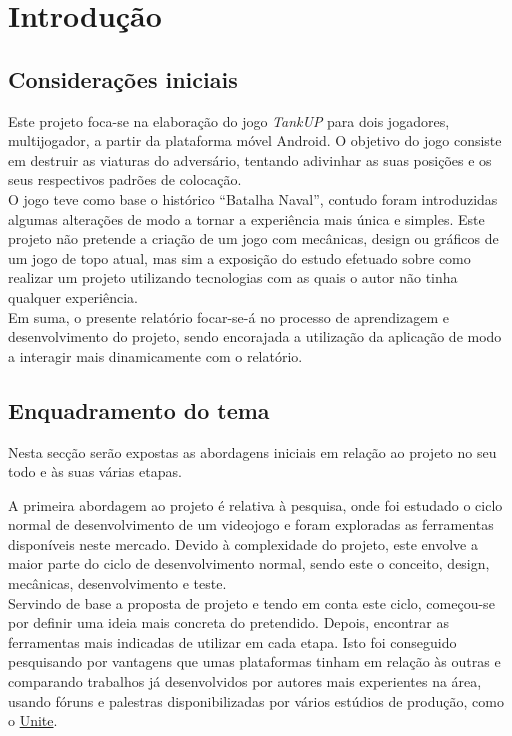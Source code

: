 \chapter{Introdução}
\label{chap:intro}
\section{Considerações iniciais}
\label{sec:PBL} 
Este projeto foca-se na elaboração do jogo \textit{TankUP} para dois jogadores, multijogador, a partir da plataforma móvel Android. O objetivo do jogo consiste em destruir as viaturas do adversário, tentando adivinhar as suas posições e os seus respectivos  padrões de colocação.\\

O jogo teve como base o histórico “Batalha Naval”, contudo foram introduzidas algumas alterações de modo a tornar a experiência mais única e simples.
Este projeto não pretende a criação de um jogo com mecânicas, design ou gráficos de um jogo de topo atual, mas sim a exposição do estudo efetuado sobre como realizar um projeto utilizando tecnologias com as quais o autor não tinha qualquer experiência.\\
Em suma, o presente relatório focar-se-á no processo de aprendizagem e desenvolvimento do projeto, sendo encorajada a utilização da aplicação de modo a interagir mais dinamicamente com o relatório.



\section{Enquadramento do tema}
\label{sec:AIL}
Nesta secção serão expostas as abordagens iniciais em relação ao projeto no seu todo e às suas várias etapas.

A primeira abordagem ao projeto é relativa à pesquisa, onde foi estudado o ciclo normal de desenvolvimento de um videojogo e foram exploradas as ferramentas disponíveis neste mercado. Devido à complexidade do projeto, este envolve a maior parte do ciclo de desenvolvimento normal, sendo este o conceito, design, mecânicas, desenvolvimento e teste. \\ 

Servindo de base a proposta de projeto e tendo em conta este ciclo, começou-se por definir uma ideia mais concreta do pretendido. Depois, encontrar as ferramentas mais indicadas de utilizar em cada etapa. Isto foi conseguido pesquisando por vantagens que umas plataformas tinham em relação às outras e comparando trabalhos já desenvolvidos por autores mais experientes na área, usando fóruns e palestras disponibilizadas por vários estúdios de produção, como o \href{https://unite.unity.com/}{Unite}.

